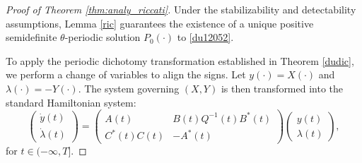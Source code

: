 \documentclass[10pt,a4paper]{amsart}
\begin{document}
	\begin{proof}[Proof of Theorem \ref{thm:analy_riccati}]
		Under the stabilizability and detectability assumptions, Lemma \ref{ric} guarantees the existence of a unique positive semidefinite $\theta$-periodic solution $P_0(\cdot)$ to \eqref{du12052}.
		
		To apply the periodic dichotomy transformation established in Theorem \ref{dudic}, we perform a change of variables to align the signs. Let $y(\cdot) = X(\cdot)$ and $\lambda(\cdot) = -Y(\cdot)$. The system governing $(X,Y)$ is then transformed into the standard Hamiltonian system:
		\begin{equation*}
			\begin{pmatrix}
				\dot{y}(t)\\ \dot{\lambda}(t)
			\end{pmatrix}=
			\begin{pmatrix}
				A(t) & B(t)Q^{-1}(t)B^*(t)\\
				C^*(t)C(t)&-A^*(t)
			\end{pmatrix}
			\begin{pmatrix}
				y(t)\\ \lambda (t)
			\end{pmatrix},  
		\end{equation*}for $t\in (-\infty,T]$.
		

\end{proof}
\end{document}
